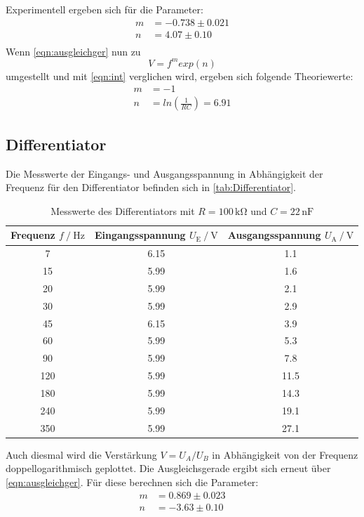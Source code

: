 Experimentell ergeben sich für die Parameter: 
\begin{align*}
    m &= -0.738 \pm 0.021 \\
    n &= 4.07 \pm 0.10 \\
\end{align*}
Wenn \autoref{eqn:ausgleichger} nun zu 
\begin{equation*}
    V = f^m exp(n)
\end{equation*}
umgestellt und mit \autoref{eqn:int} verglichen wird, ergeben sich folgende Theoriewerte:
\begin{align*}
    m &= -1 \\
    n &= ln(\frac{1}{RC}) = 6.91
\end{align*}


\subsection{Differentiator}
Die Messwerte der Eingangs- und Ausgangsspannung in Abhängigkeit der Frequenz für den Differentiator befinden sich in \autoref{tab:Differentiator}.
\begin{table}
    \centering
    \caption{Messwerte des Differentiators mit $R=100\,\unit{\kilo\ohm}$ und $C=22\,\unit{\nano\farad}$}
    \begin{tabular}{c c c}
        \toprule
        Frequenz $f\mathbin{/}\unit{\hertz}$ & Eingangsspannung $U_{\text{E}}\mathbin{/}\unit{\volt}$& Ausgangsspannung $U_{\text{A}}\mathbin{/}\unit{\volt}$ \\
        \midrule
        7& 6.15 & 1.1 \\
        15 & 5.99 & 1.6 \\
        20 & 5.99 & 2.1 \\
        30 & 5.99 & 2.9 \\
        45 & 6.15 & 3.9 \\
        60 & 5.99 & 5.3 \\
        90 & 5.99 & 7.8 \\
        120 & 5.99 & 11.5 \\
        180 & 5.99 & 14.3 \\
        240 & 5.99 & 19.1 \\
        350 & 5.99 & 27.1 \\
        \bottomrule
    \end{tabular}
    \label{tab:Differentiator}
\end{table}
Auch diesmal wird die Verstärkung $V=U_A/U_B$ in Abhängigkeit von der Frequenz doppellogarithmisch geplottet. Die Ausgleichsgerade 
ergibt sich erneut über \autoref{eqn:ausgleichger}. Für diese berechnen sich die Parameter:
\begin{align*}
    m&= 0.869 \pm 0.023\\
    n &=-3.63 \pm 0.10 \\
\end{align*}

